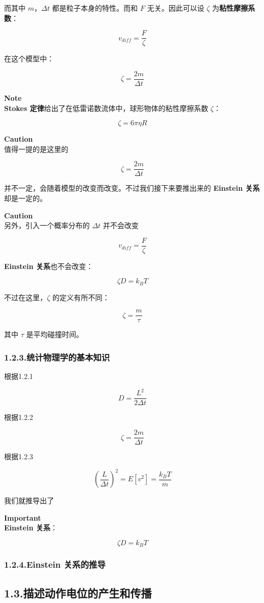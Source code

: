 \documentclass[
]{article}
\begin{document}
而其中 \(m\)，\(\Delta t\) 都是粒子本身的特性。而和 \(F\)
无关。因此可以设 \(\zeta\) 为\textbf{粘性摩擦系数}：

\[v_{diff}=\frac{F}{\zeta}\]

在这个模型中：

\[\zeta = \frac{2m}{\Delta t}\]

\textbf{Note}\\

\textbf{Stokes 定律}给出了在低雷诺数流体中，球形物体的粘性摩擦系数
\(\zeta\)：

\[\zeta=6\pi\eta R\]

\textbf{Caution}\\

值得一提的是这里的

\[\zeta=\frac{2m}{\Delta t}\]

并不一定，会随着模型的改变而改变。不过我们接下来要推出来的
\textbf{Einstein 关系} 却是一定的。

\textbf{Caution}\\

另外，引入一个概率分布的 \(\Delta t\) 并不会改变

\[v_{diff}=\frac{F}{\zeta}\]

\textbf{Einstein 关系}也不会改变：

\[\zeta D=k_BT\]

不过在这里，\(\zeta\) 的定义有所不同：

\[\zeta = \frac{m}{\tau}\]

其中 \(\tau\) 是平均碰撞时间。

\subsubsection{1.2.3.统计物理学的基本知识}\label{123ux7edfux8ba1ux7269ux7406ux5b66ux7684ux57faux672cux77e5ux8bc6}

根据1.2.1

\[D=\frac{L^2}{2\Delta t}\]

根据1.2.2

\[\zeta = \frac{2m}{\Delta t}\]

根据1.2.3

\[(\frac{L}{\Delta t})^2=E[v^2]=\frac{k_BT}{m}\]

我们就推导出了

\textbf{Important}\\

\textbf{Einstein 关系}：

\[\zeta D=k_B T\]

\subsubsection{1.2.4.Einstein
关系的推导}\label{124einstein-ux5173ux7cfbux7684ux63a8ux5bfc}

\subsection{1.3.描述动作电位的产生和传播}\label{13ux63cfux8ff0ux52a8ux4f5cux7535ux4f4dux7684ux4ea7ux751fux548cux4f20ux64ad}
\end{document}
